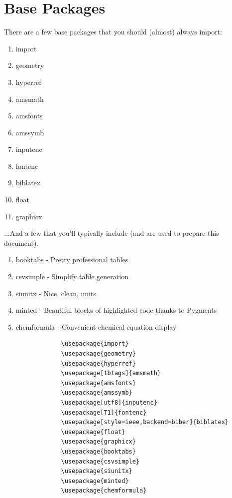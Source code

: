 \documentclass[hidelinks, 12pt]{article}%
\begin{document}
    \section{Base Packages}
        There are a few base packages that you should (almost) always import:
        \begin{enumerate}
            \item import
            \item geometry
            \item hyperref
            \item amsmath
            \item amsfonts
            \item amssymb
            \item inputenc
            \item fontenc
            \item biblatex
            \item float
            \item graphicx
        \end{enumerate}
        ...And a few that you'll typically include (and are used to prepare this document).
        \begin{enumerate}
            \item booktabs - Pretty professional tables
            \item csvsimple - Simplify table generation
            \item siunitx - Nice, clean, units
            \item minted - Beautiful blocks of highlighted code thanks to Pygments
            \item chemformula - Convenient chemical equation display
        \end{enumerate}

        \begin{listing}[H]
            \begin{verbatim}
                \usepackage{import}
                \usepackage{geometry}
                \usepackage{hyperref}
                \usepackage[tbtags]{amsmath}
                \usepackage{amsfonts}
                \usepackage{amssymb}
                \usepackage[utf8]{inputenc}
                \usepackage[T1]{fontenc}
                \usepackage[style=ieee,backend=biber]{biblatex}
                \usepackage{float}
                \usepackage{graphicx}
                \usepackage{booktabs}
                \usepackage{csvsimple}
                \usepackage{siunitx}
                \usepackage{minted}
                \usepackage{chemformula}
            \end{verbatim}
            \caption{Code to include packages in a \LaTeX document (as used in this document)}
            \label{lst:packages}
        \end{listing}
\end{document}
